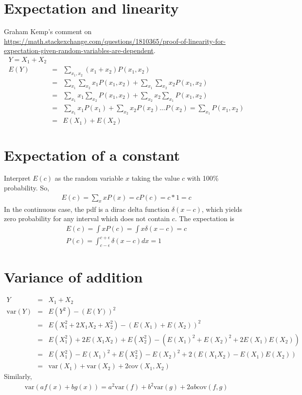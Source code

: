 \documentclass{article}
\newcommand{\ber}{\begin{eqnarray}}
\newcommand{\eer}{\end{eqnarray}}
\begin{document}
\section{Expectation and linearity}
Graham Kemp's comment on \url{https://math.stackexchange.com/questions/1810365/proof-of-linearity-for-expectation-given-random-variables-are-dependent}.
\ber
Y = X_1 + X_2 \\
E(Y) &=& \sum_{x_1,x_2}(x_1 + x_2)P(x_1,x_2) \\
&=& \sum_{x_1}\sum_{x_2}x_1P(x_1,x_2) + \sum_{x_1}\sum_{x_2}x_2P(x_1,x_2) \\
&=& \sum_{x_1}x_1\sum_{x_2}P(x_1,x_2)  + \sum_{x_2}x_2\sum_{x_1}P(x_1,x_2) \\
&=& \sum_{x_1}x_1P(x_1) + \sum_{x_2}x_2P(x_2) \text{...}P(x_2)=\sum_{x_1}P(x_1,x_2)\\
&=& E(X_1) + E(X_2)
\eer
\section{Expectation of a constant}
Interpret $E(c)$ as the random variable $x$ taking the value $c$ with 100\% probability. So,
\ber
E(c) = \sum_{x}xP(x) = cP(c) = c*1 = c
\eer
In the continuous case, the pdf is a dirac delta function $\delta(x-c)$, which yields zero probability for any interval which does not contain $c$. The expectation is
\ber
E(c) = \int xP(c) = \int x \delta(x-c) = c \\
P(c) = \int_{c-\epsilon}^{c+\epsilon}\delta(x-c) dx = 1
\eer

\section{Variance of addition}
\ber
Y &=& X_1 + X_2 \\
\text{var}(Y) &=& E(Y^2) - (E(Y))^2\\
&=& E(X_1^2 + 2X_1X_2 + X_2^2) - (E(X_1) + E(X_2))^2 \\
&=& E(X_1^2) + 2E(X_1X_2) + E(X_2^2) - (E(X_1)^2 + E(X_2)^2 + 2E(X_1)E(X_2)) \\
&=& E(X_1^2) - E(X_1)^2 + E(X_2^2) - E(X_2)^2 +2(E(X_1X_2)-E(X_1)E(X_2)) \\
&=& \text{var}(X_1) + \text{var}(X_2) +2\text{cov}(X_1,X_2)
\eer
Similarly,
\ber
\text{var}(af(x)+bg(x)) = a^2\text{var}(f) + b^2\text{var}(g) +2ab\text{cov}(f,g) 
\eer
\end{document}
